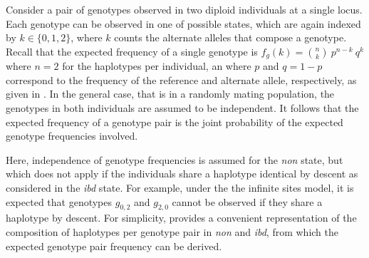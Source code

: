 Consider a pair of genotypes observed in two diploid individuals at a single locus.
Each genotype can be observed in one of  possible states, which are again indexed by ${k \in \lbrace 0,1,2 \rbrace}$, where $k$ counts the alternate alleles that compose a genotype.
Recall that the expected frequency of a single genotype is ${f_{g}(k) = {{n}\choose{k}}~p^{n-k}~q^{k}}$ where ${n=2}$ for the  haplotypes per individual, an where $p$ and ${q=1-p}$ correspond to the frequency of the reference and alternate allele, respectively, as given in .
In the general case, that is in a randomly mating population, the genotypes in both individuals are assumed to be independent.
It follows that the expected frequency of a genotype pair is the joint probability of the expected genotype frequencies involved.

%

%

Here, independence of genotype frequencies is assumed for the \emph{non} state, but which does not apply if the  individuals share a haplotype identical by descent as considered in the \emph{ibd} state.
For example, under the the infinite sites model, it is expected that genotypes $g_{0,2}$ and $g_{2,0}$ cannot be observed if they share a haplotype by descent.
For simplicity,  provides a convenient representation of the composition of haplotypes per genotype pair in \emph{non} and \emph{ibd}, from which the expected genotype pair frequency can be derived.

